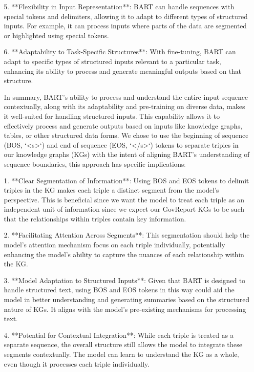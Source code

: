 5. **Flexibility in Input Representation**: BART can handle sequences with special tokens and delimiters, allowing it to adapt to different types of structured inputs. For example, it can process inputs where parts of the data are segmented or highlighted using special tokens.

6. **Adaptability to Task-Specific Structures**: With fine-tuning, BART can adapt to specific types of structured inputs relevant to a particular task, enhancing its ability to process and generate meaningful outputs based on that structure.

In summary, BART's ability to process and understand the entire input sequence contextually, along with its adaptability and pre-training on diverse data, makes it well-suited for handling structured inputs. This capability allows it to effectively process and generate outputs based on inputs like knowledge graphs, tables, or other structured data forms.
We chose to use the beginning of sequence (BOS, `<s>`) and end of sequence (EOS, `</s>`) tokens to separate triples in our knowledge graphs (KGs) with the intent of aligning BART's understanding of sequence boundaries, this approach has specific implications:

1. **Clear Segmentation of Information**: Using BOS and EOS tokens to delimit triples in the KG makes each triple a distinct segment from the model's perspective. This is beneficial since we want the model to treat each triple as an independent unit of information since we expect our GovReport KGs to be such that the relationships within triples contain key information.

2. **Facilitating Attention Across Segments**: This segmentation should help the model's attention mechanism focus on each triple individually, potentially enhancing the model's ability to capture the nuances of each relationship within the KG.

3. **Model Adaptation to Structured Inputs**: Given that BART is designed to handle structured text, using BOS and EOS tokens in this way could aid the model in better understanding and generating summaries based on the structured nature of KGs. It aligns with the model's pre-existing mechanisms for processing text.

4. **Potential for Contextual Integration**: While each triple is treated as a separate sequence, the overall structure still allows the model to integrate these segments contextually. The model can learn to understand the KG as a whole, even though it processes each triple individually.

